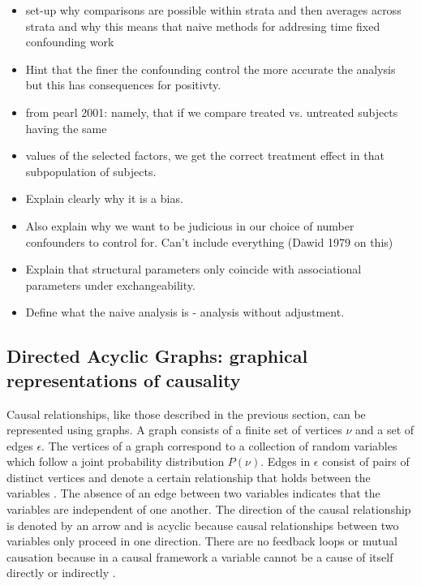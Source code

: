 \documentclass[11pt]{article}
\providecommand{\tightlist}{%
      \setlength{\itemsep}{0pt}\setlength{\parskip}{0pt}}
\begin{document}
\begin{itemize}
\tightlist
\item
  set-up why comparisons are possible within strata and then averages
  across strata and why this means that naive methods for addresing time
  fixed confounding work
\item
  Hint that the finer the confounding control the more accurate the
  analysis but this has consequences for positivty.
\item
  from pearl 2001: namely, that if we compare treated vs. untreated
  subjects having the same
\item
  values of the selected factors, we get the correct treatment effect in
  that subpopulation of subjects.
\item
  Explain clearly why it is a bias.
\item
  Also explain why we want to be judicious in our choice of number
  confounders to control for. Can't include everything (Dawid 1979 on
  this)
\item
  Explain that structural parameters only coincide with associational
  parameters under exchangeability.
\item
  Define what the naive analysis is - analysis without adjustment.
\end{itemize}

    \subsection{Directed Acyclic Graphs: graphical representations of
causality}\label{directed-acyclic-graphs-graphical-representations-of-causality}

Causal relationships, like those described in the previous section, can
be represented using graphs. A graph consists of a finite set of
vertices \(\nu\) and a set of edges \(\epsilon\). The vertices of a
graph correspond to a collection of random variables which follow a
joint probability distribution \(P(\nu)\). Edges in \(\epsilon\) consist
of pairs of distinct vertices and denote a certain relationship that
holds between the variables \citet{Pearl2009}. The absence of an edge
between two variables indicates that the variables are independent of
one another. The direction of the causal relationship is denoted by an
arrow and is acyclic because causal relationships between two variables
only proceed in one direction. There are no feedback loops or mutual
causation because in a causal framework a variable cannot be a cause of
itself directly or indirectly \citet{Hernan2004}.\linebreak
\end{document}
